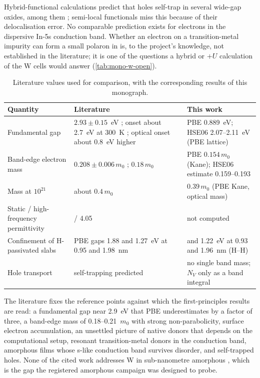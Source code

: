 Hybrid-functional calculations predict that holes self-trap in several wide-gap oxides, \InO{} among them
\citep{Varley2012}; semi-local functionals miss this because of their delocalisation error. No comparable prediction
exists for electrons in the dispersive In-5s conduction band. Whether an electron on a transition-metal impurity can form
a small polaron in \InO{} is, to the project's knowledge, not established in the literature; it is one of the questions a
hybrid or $+U$ calculation of the W cells would answer (\cref{tab:mono-w-open}).

\begin{table}[htbp]\centering\small
\caption{Literature values used for comparison, with the corresponding results of this monograph.}
\label{tab:mono-lit-values}
\begin{tabularx}{\linewidth}{@{}>{\raggedright\arraybackslash}p{3.3cm}>{\raggedright\arraybackslash}X>{\raggedright\arraybackslash}p{4.0cm}@{}}
\toprule
Quantity & Literature & This work \\\midrule
Fundamental gap & $2.93\pm0.15$~eV \citep{King2009}; onset about 2.7~eV at 300~K \citep{Irmscher2014}; optical onset about
0.8~eV higher \citep{Walsh2008} & PBE 0.889~eV; HSE06 2.07--2.11~eV (PBE lattice) \\
Band-edge electron mass & $0.208\pm0.006\,m_0$ \citep[p.~225102-1]{Stokey2021}; $0.18\,m_0$ \citep{Feneberg2016} & PBE
$0.154\,m_0$ (Kane); HSE06 estimate 0.159--0.193 \\
Mass at $10^{21}$\cmcu{} & about $0.4\,m_0$ \citep{Feneberg2016} & $0.39\,m_0$ (PBE Kane, optical mass) \\
Static / high-frequency permittivity & 10.55 / 4.05 \citep[p.~225102-1]{Stokey2021} & not computed \\
Confinement of H-passivated slabs & PBE gaps 1.88 and 1.27~eV at 0.95 and 1.98~nm \citep[p.~21542]{Lin2022} & 1.79 and
1.22~eV at 0.93 and 1.96~nm (H--H) \\
Hole transport & self-trapping predicted \citep{Varley2012} & no single band mass; $N_V$ only as a band integral \\\bottomrule
\end{tabularx}
\end{table}

\begin{keyresult}
The literature fixes the reference points against which the first-principles results are read: a fundamental gap near
2.9~eV that PBE underestimates by a factor of three, a band-edge mass of 0.18--0.21~$m_0$ with strong non-parabolicity,
surface electron accumulation, an unsettled picture of native donors that depends on the computational setup, resonant
transition-metal donors in the conduction band, amorphous films whose s-like conduction band survives disorder, and
self-trapped holes. None of the cited work addresses W in sub-nanometre amorphous \InO{}, which is the gap the registered
amorphous campaign was designed to probe.
\end{keyresult}
